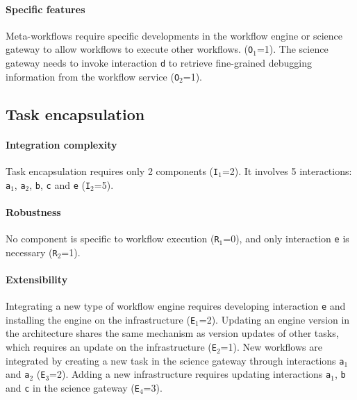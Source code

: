 \documentclass[preprint,3p,twocolumn]{elsarticle}
\newcommand{\todo}[2]{\pdfmargincomment[color=red,author=#1,open=true]{#2}}
\begin{document}
\paragraph{Specific features} Meta-workflows require specific
developments in the workflow engine or science gateway to allow
workflows to execute other workflows.  (\texttt{O$_1$}=1).
 The
science gateway needs to invoke interaction \texttt{d} to retrieve
fine-grained debugging information from the workflow service
(\texttt{O$_2$}=1).

\subsection{Task encapsulation}

\paragraph{Integration complexity} Task encapsulation requires only 2
components (\texttt{I$_1$}=2).  It involves 5 interactions:
\texttt{a$_1$}, \texttt{a$_2$}, \texttt{b}, \texttt{c} and
\texttt{e} (\texttt{I$_2$}=5).

\paragraph{Robustness} No component is specific to workflow execution
(\texttt{R$_1$}=0), and only interaction \texttt{e} is necessary
(\texttt{R$_2$}=1).

\paragraph{Extensibility} Integrating a new type of workflow engine
requires developing interaction \texttt{e} and  installing the engine
on the infrastructure (\texttt{E$_1$}=2). Updating an engine version
in the architecture shares the same mechanism as version updates of
other tasks, which requires an update on the
infrastructure (\texttt{E$_2$}=1).  New workflows are integrated by
creating a new task in the science gateway through interactions
\texttt{a$_1$} and \texttt{a$_2$} (\texttt{E$_3$}=2). Adding a new
infrastructure requires updating interactions \texttt{a$_1$},
\texttt{b} and \texttt{c} in the science gateway (\texttt{E$_4$}=3).

\end{document}
